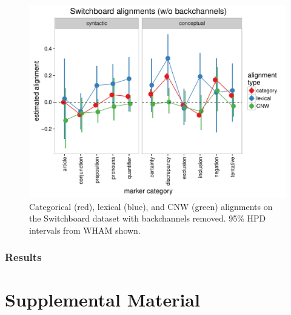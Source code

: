 \documentclass[11pt]{article}
\begin{document}
{\begin{figure}[t]
  \begin{center}
    \includegraphics[width=\columnwidth]{results/swbdn_line.pdf}
  \end{center}
  \caption{Categorical (red), lexical (blue), and CNW (green) alignments on the Switchboard dataset with backchannels removed. 95\% HPD intervals from WHAM shown.}\label{fig:swbdn-res}
\end{figure}

\subsubsection{Results}



%

%
%



\appendix

\section{Supplemental Material}
\label{sec:supplemental}

}
\end{document}
